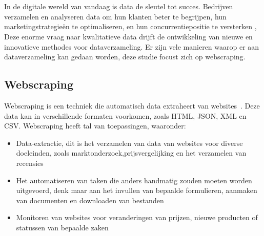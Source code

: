 \chapter{}%
\label{ch:stand-van-zaken}


In de digitale wereld van vandaag is data de sleutel tot succes. Bedrijven verzamelen en analyseren data om hun klanten beter te begrijpen, hun marketingstrategieën te optimaliseren, en hun concurrentiepositie te versterken \autocite{OnesiOzigagun2024},
Deze enorme vraag naar kwalitatieve data drijft de ontwikkeling van nieuwe en innovatieve methodes voor dataverzameling. Er zijn vele manieren waarop er aan dataverzameling kan gedaan worden, deze studie focust zich op webscraping.

\section{Webscraping}
Webscraping is een techniek die automatisch data extraheert van websites~\autocite{Khder2021}. Deze data kan in verschillende formaten voorkomen, zoals HTML, JSON, XML en CSV. Webscraping heeft tal van toepassingen, waaronder:
\begin{itemize}
    \item Data-extractie, dit is het verzamelen van data van websites voor diverse doeleinden,
    zoals marktonderzoek,prijsvergelijking en het verzamelen van recensies
    \item Het automatiseren van taken die anders handmatig zouden moeten worden uitgevoerd, denk maar
    aan het invullen van bepaalde formulieren, aanmaken van documenten en downloaden van bestanden
    \item Monitoren van websites voor veranderingen van prijzen, nieuwe producten of statussen van bepaalde zaken
\end{itemize}


